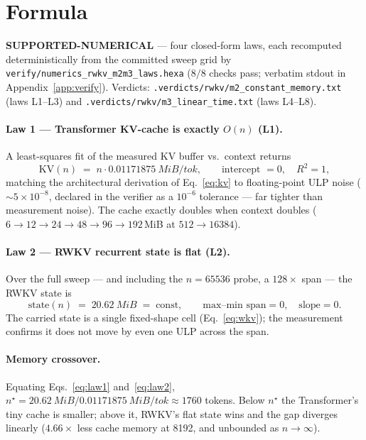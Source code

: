 \documentclass[11pt,a4paper]{article}
\newcommand{\green}[1]{\textcolor{green!50!black}{\textbf{#1}}}
\newcommand{\ctx}{\ensuremath{n}}
\begin{document}
\section{Formula}
\label{sec:formula}
\green{SUPPORTED-NUMERICAL} --- four closed-form laws, each recomputed
deterministically from the committed sweep grid by
\texttt{verify/numerics\_rwkv\_m2m3\_laws.hexa} (\(8/8\) checks pass; verbatim
stdout in Appendix~\ref{app:verify}). Verdicts:
\texttt{.verdicts/rwkv/m2\_constant\_memory.txt} (laws L1--L3) and
\texttt{.verdicts/rwkv/m3\_linear\_time.txt} (laws L4--L8).

\paragraph{Law 1 --- Transformer KV-cache is exactly \(O(\ctx)\) (L1).}
A least-squares fit of the measured KV buffer vs.\ context returns
\begin{equation}
\label{eq:law1}
\mathrm{KV}(\ctx) \;=\; \ctx \cdot \SI{0.01171875}{MiB/tok},
\qquad \text{intercept } = 0,\quad R^2 = 1,
\end{equation}
matching the architectural derivation of Eq.~\eqref{eq:kv} to floating-point ULP
noise (\(\sim\!5\times10^{-8}\), declared in the verifier as a \(10^{-6}\)
tolerance --- far tighter than measurement noise). The cache exactly doubles when
context doubles (\(6\to12\to24\to48\to96\to192\,\)MiB at
\(512\to\num{16384}\)).

\paragraph{Law 2 --- RWKV recurrent state is flat (L2).}
Over the full sweep --- and including the \(\ctx=\num{65536}\) probe, a
\(128\times\) span --- the RWKV state is
\begin{equation}
\label{eq:law2}
\mathrm{state}(\ctx) \;=\; \SI{20.62}{MiB} \;=\; \text{const},
\qquad \text{max--min span} = 0,\quad \text{slope} = 0.
\end{equation}
The carried state is a single fixed-shape cell (Eq.~\eqref{eq:wkv}); the
measurement confirms it does not move by even one ULP across the span.

\paragraph{Memory crossover.}
Equating Eqs.~\eqref{eq:law1} and~\eqref{eq:law2},
\(\ctx^\star = \SI{20.62}{MiB} / \SI{0.01171875}{MiB/tok} \approx \num{1760}\)
tokens. Below \(\ctx^\star\) the Transformer's tiny cache is smaller; above it,
RWKV's flat state wins and the gap diverges linearly (\(4.66\times\) less cache
memory at \num{8192}, and unbounded as \(\ctx\to\infty\)).
\end{document}
